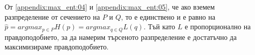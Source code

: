 \documentclass[main.tex]{subfiles}
\begin{document}
От \autoref{appendix:max_ent:04} и \autoref{appendix:max_ent:05}, че ако вземем разпределение от сечението на $P$ и $Q$, то е единствено и е равно на $\hat{p} = argmax_{p \in P} H(p) = argmax_{q \in Q} L(q)$. Тъй като $L$ е пропорционално на правдоподобието, за да намерим търсеното разпределение е достатъчно да максимизираме правдоподобието.
\end{document}
